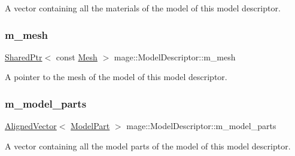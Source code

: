 A vector containing all the materials of the model of this model descriptor. \hypertarget{classmage_1_1_model_descriptor_a675b02d184e775c03c05006f8fa9aeb4}{}\label{classmage_1_1_model_descriptor_a675b02d184e775c03c05006f8fa9aeb4} 
\subsubsection{\texorpdfstring{m\+\_\+mesh}{m\_mesh}}
{\footnotesize\ttfamily \hyperlink{namespacemage_a1e01ae66713838a7a67d30e44c67703e}{Shared\+Ptr}$<$ const \hyperlink{classmage_1_1_mesh}{Mesh} $>$ mage\+::\+Model\+Descriptor\+::m\+\_\+mesh\hspace{0.3cm}{\ttfamily [private]}}

A pointer to the mesh of the model of this model descriptor. \hypertarget{classmage_1_1_model_descriptor_a5b24f94509a05fc88ca62a4c0536bf7c}{}\label{classmage_1_1_model_descriptor_a5b24f94509a05fc88ca62a4c0536bf7c} 
\subsubsection{\texorpdfstring{m\+\_\+model\+\_\+parts}{m\_model\_parts}}
{\footnotesize\ttfamily \hyperlink{namespacemage_a8664bfb5ce2179fc64eae9f82c8a5ba8}{Aligned\+Vector}$<$ \hyperlink{structmage_1_1_model_part}{Model\+Part} $>$ mage\+::\+Model\+Descriptor\+::m\+\_\+model\+\_\+parts\hspace{0.3cm}{\ttfamily [private]}}

A vector containing all the model parts of the model of this model descriptor. 